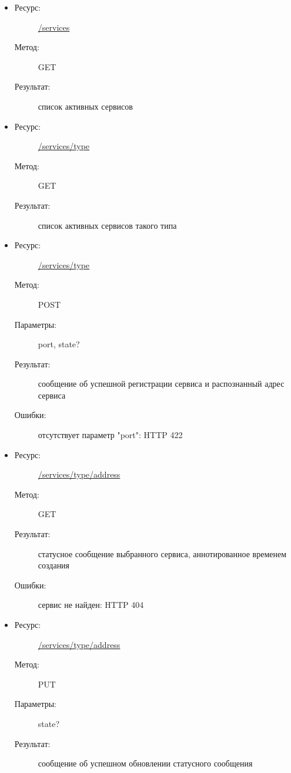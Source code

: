 \documentclass[a4paper,12pt]{report}
\numberwithin{equation}{section}
\begin{document}
  \begin{itemize}
    \item
    \begin{description}
      \item[Ресурс:] \url{/services}
      \item[Метод:] GET
      \item[Результат:] список активных сервисов
    \end{description}
    \item
    \begin{description}
      \item[Ресурс:] \url{/services/type}
      \item[Метод:] GET
      \item[Результат:] список активных сервисов такого типа
    \end{description}
    \item
    \begin{description}
      \item[Ресурс:] \url{/services/type}
      \item[Метод:] POST
      \item[Параметры:] port, state?
      \item[Результат:] сообщение об успешной регистрации сервиса и распознанный адрес сервиса
      \item[Ошибки:] отсутствует параметр "port": HTTP 422
    \end{description}
    \item
    \begin{description}
      \item[Ресурс:] \url{/services/type/address}
      \item[Метод:] GET
      \item[Результат:] статусное сообщение выбранного сервиса, аннотированное временем создания
      \item[Ошибки:] сервис не найден: HTTP 404
    \end{description}
    \item
    \begin{description}
      \item[Ресурс:] \url{/services/type/address}
      \item[Метод:] PUT
      \item[Параметры:] state?
      \item[Результат:] сообщение об успешном обновлении статусного сообщения
    \end{description}
  \end{itemize}
  
\end{document}
